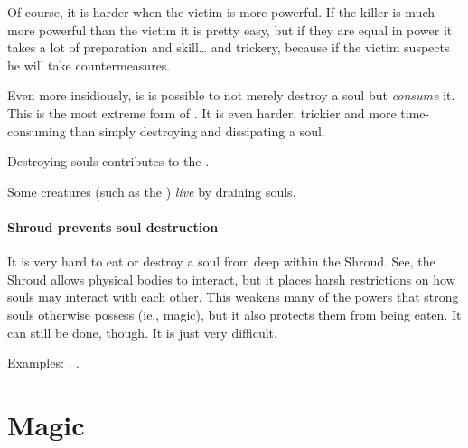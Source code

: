 Of course, it is harder when the victim is more powerful. 
If the killer is much more powerful than the victim it is pretty easy, but if they are equal in power it takes a lot of preparation and skill\ldots{} and trickery, because if the victim suspects he will take countermeasures. 

Even more insidiously, is is possible to not merely destroy a soul but \emph{consume} it. 
This is the most extreme form of . 
It is even harder, trickier and more time-consuming than simply destroying and dissipating a soul. 

Destroying souls contributes to the . 

Some creatures (such as the ) \emph{live} by draining souls. 





\subsubsection{Shroud prevents soul destruction}
It is very hard to eat or destroy a soul from deep within the Shroud. 
See, the Shroud allows physical bodies to interact, but it places harsh restrictions on how souls may interact with each other. 
This weakens many of the powers that strong souls otherwise possess (ie., magic), but it also protects them from being eaten. 
It can still be done, though. 
It is just very difficult. 

Examples: 
. 
. 
 

























\chapter{Magic}
















